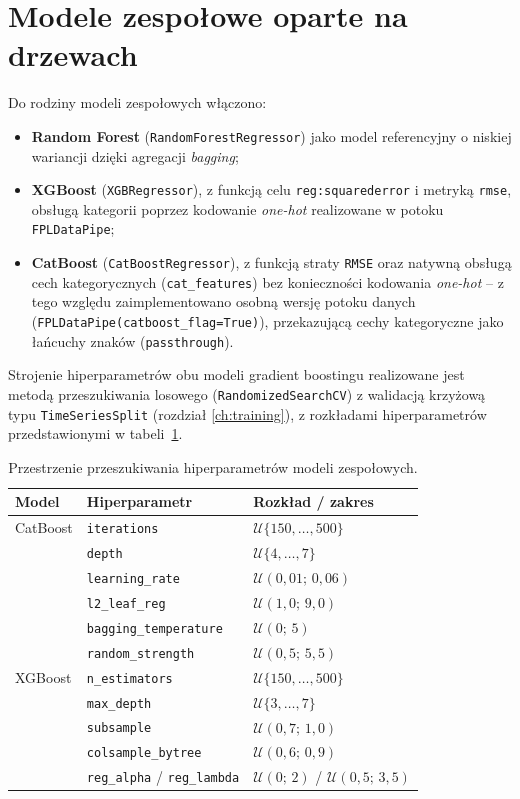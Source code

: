 \documentclass[a4paper,twoside,11pt]{mwrep}
\theoremstyle{plain} \newtheorem{thm}{Twierdzenie}
\theoremstyle{plain} \newtheorem{lem}{Lemat}
\theoremstyle{definition} \newtheorem{defn}{Definicja}
\theoremstyle{remark} \newtheorem*{rem}{Wniosek}
\begin{document}
\section{Modele zespołowe oparte na drzewach}

Do rodziny modeli zespołowych włączono:
\begin{itemize}
    \item \textbf{Random Forest} (\texttt{RandomForestRegressor}) jako
    model referencyjny o niskiej wariancji dzięki agregacji \emph{bagging};
    \item \textbf{XGBoost} (\texttt{XGBRegressor}), z funkcją celu
    \texttt{reg:squarederror} i metryką \texttt{rmse}, obsługą kategorii
    poprzez kodowanie \emph{one-hot} realizowane w potoku
    \texttt{FPLDataPipe};
    \item \textbf{CatBoost} (\texttt{CatBoostRegressor}), z funkcją straty
    \texttt{RMSE} oraz natywną obsługą cech kategorycznych
    (\texttt{cat\_features}) bez konieczności kodowania \emph{one-hot} --
    z tego względu zaimplementowano osobną wersję potoku danych
    (\texttt{FPLDataPipe(catboost\_flag=True)}), przekazującą cechy
    kategoryczne jako łańcuchy znaków (\texttt{passthrough}).
\end{itemize}

Strojenie hiperparametrów obu modeli gradient boostingu realizowane jest
metodą przeszukiwania losowego (\texttt{RandomizedSearchCV}) z
walidacją krzyżową typu \texttt{TimeSeriesSplit} (rozdział
\ref{ch:training}), z rozkładami hiperparametrów przedstawionymi w
tabeli~\ref{tab:hparams}.

\begin{table}[h]
\centering
\caption{Przestrzenie przeszukiwania hiperparametrów modeli zespołowych.}
\label{tab:hparams}
\begin{tabular}{lll}
\toprule
Model & Hiperparametr & Rozkład / zakres \\
\midrule
CatBoost & \texttt{iterations} & $\mathcal{U}\{150,\dots,500\}$ \\
         & \texttt{depth} & $\mathcal{U}\{4,\dots,7\}$ \\
         & \texttt{learning\_rate} & $\mathcal{U}(0{,}01;\,0{,}06)$ \\
         & \texttt{l2\_leaf\_reg} & $\mathcal{U}(1{,}0;\,9{,}0)$ \\
         & \texttt{bagging\_temperature} & $\mathcal{U}(0;\,5)$ \\
         & \texttt{random\_strength} & $\mathcal{U}(0{,}5;\,5{,}5)$ \\
\midrule
XGBoost  & \texttt{n\_estimators} & $\mathcal{U}\{150,\dots,500\}$ \\
         & \texttt{max\_depth} & $\mathcal{U}\{3,\dots,7\}$ \\
         & \texttt{subsample} & $\mathcal{U}(0{,}7;\,1{,}0)$ \\
         & \texttt{colsample\_bytree} & $\mathcal{U}(0{,}6;\,0{,}9)$ \\
         & \texttt{reg\_alpha} / \texttt{reg\_lambda} & $\mathcal{U}(0;\,2)$ / $\mathcal{U}(0{,}5;\,3{,}5)$ \\
\bottomrule
\end{tabular}
\end{table}
\end{document}
